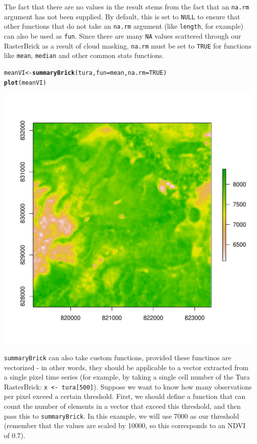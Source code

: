 \documentclass{article}\usepackage[]{graphicx}\usepackage[]{color}
\makeatletter
\def\maxwidth{ %
  \ifdim\Gin@nat@width>\linewidth
    \linewidth
  \else
    \Gin@nat@width
  \fi
}
\newcommand{\hlnum}[1]{\textcolor[rgb]{0.686,0.059,0.569}{#1}}%
\newcommand{\hlstd}[1]{\textcolor[rgb]{0.345,0.345,0.345}{#1}}%
\newcommand{\hlkwb}[1]{\textcolor[rgb]{0.69,0.353,0.396}{#1}}%
\newcommand{\hlkwc}[1]{\textcolor[rgb]{0.333,0.667,0.333}{#1}}%
\newcommand{\hlkwd}[1]{\textcolor[rgb]{0.737,0.353,0.396}{\textbf{#1}}}%
\newenvironment{kframe}{%
 \def\at@end@of@kframe{}%
 \ifinner\ifhmode%
  \def\at@end@of@kframe{\end{minipage}}%
  \begin{minipage}{\columnwidth}%
 \fi\fi%
 \def\FrameCommand##1{\hskip\@totalleftmargin \hskip-\fboxsep
 \colorbox{shadecolor}{##1}\hskip-\fboxsep
     \hskip-\linewidth \hskip-\@totalleftmargin \hskip\columnwidth}%
 \MakeFramed {\advance\hsize-\width
   \@totalleftmargin\z@ \linewidth\hsize
   \@setminipage}}%
 {\par\unskip\endMakeFramed%
 \at@end@of@kframe}
\newenvironment{knitrout}{}{} %
\def\code#1{\texttt{#1}}
\makeatother
\begin{document}
The fact that there are no values in the result stems from the fact that an \code{na.rm} argument has not been supplied. By default, this is set to \code{NULL} to ensure that other functions that do not take an \code{na.rm} argument (like \code{length}, for example) can also be used as \code{fun}. Since there are many \code{NA} values scattered through our RasterBrick as a result of cloud masking, \code{na.rm} must be set to \code{TRUE} for functions like \code{mean}, \code{median} and other common stats functions.

\begin{knitrout}
\color{fgcolor}\begin{kframe}
\begin{alltt}
\hlstd{meanVI} \hlkwb{<-} \hlkwd{summaryBrick}\hlstd{(tura,} \hlkwc{fun} \hlstd{= mean,} \hlkwc{na.rm} \hlstd{=} \hlnum{TRUE}\hlstd{)}
\hlkwd{plot}\hlstd{(meanVI)}
\end{alltt}
\end{kframe}
\includegraphics[width=\maxwidth]{figure/summaryBrick-narm} 

\end{knitrout}


\code{summaryBrick} can also take custom functions, provided these functinos are vectorized - in other words, they should be applicable to a vector extracted from a single pixel time series (for example, by taking a single cell number of the Tura RasterBrick: \code{x <- tura[500]}). Suppose we want to know how many observations per pixel exceed a certain threshold. First, we should define a function that can count the number of elements in a vector that exceed this threshold, and then pass this to \code{summaryBrick}. In this example, we will use 7000 as our threshold (remember that the values are scaled by 10000, so this corresponds to an NDVI of 0.7).
\end{document}
